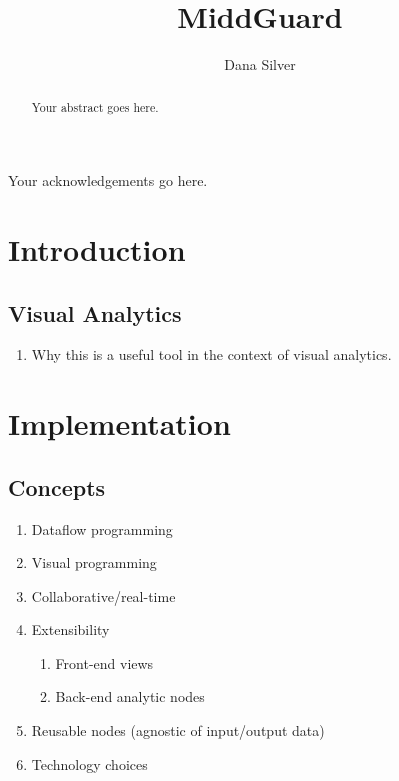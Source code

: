 \documentclass[midd]{thesis}
\title {MiddGuard}
\author {Dana Silver}
\begin{document}
\maketitle

\begin{abstract}
Your abstract goes here.
\end{abstract}

\begin{acknowledgements}
Your acknowledgements go here.
\end{acknowledgements}

\contentspage
\tablelistpage
\figurelistpage

\normalspacing \setcounter{page}{1} 

\chapter{Introduction}

\section{Visual Analytics}
\begin{enumerate}
  \item Why this is a useful tool in the context of visual analytics.
\end{enumerate}



\chapter{Implementation}

\section{Concepts}
  \begin{enumerate}
    \item Dataflow programming
    \item Visual programming
    \item Collaborative/real-time
    \item Extensibility
    \begin{enumerate}
      \item Front-end views
      \item Back-end analytic nodes
    \end{enumerate}
    \item Reusable nodes (agnostic of input/output data)
    \item Technology choices
  \end{enumerate}
\end{document}
